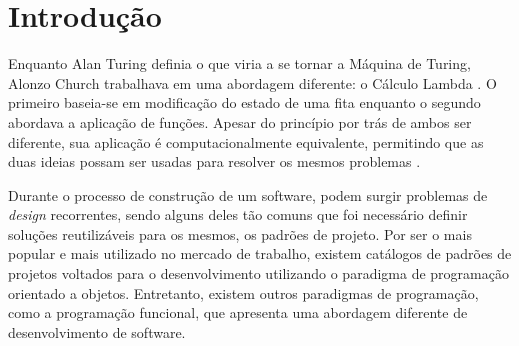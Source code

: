 
\chapter{Introdução}
%

Enquanto Alan Turing definia o que viria a 
se tornar a Máquina de Turing, Alonzo Church 
trabalhava em uma abordagem diferente: o Cálculo Lambda
\cite{church1932set,church1936unsolvable,sep-turing-machine}. 
O primeiro baseia-se em modificação do estado de 
uma fita enquanto o segundo abordava a aplicação 
de funções. Apesar do princípio por trás de ambos 
ser diferente, sua aplicação é computacionalmente 
equivalente, permitindo que as duas ideias possam 
ser usadas para resolver os mesmos problemas
\cite{sep-church-turing}.


Durante o processo de construção de um 
software, podem surgir problemas de \textit{design} 
recorrentes, sendo alguns deles 
tão comuns que foi necessário definir soluções 
reutilizáveis para os mesmos, os padrões 
de projeto. Por ser o mais 
popular e mais utilizado no mercado de trabalho, 
existem catálogos de padrões de projetos voltados 
para o desenvolvimento utilizando o 
paradigma de programação orientado a objetos. 
Entretanto, existem outros paradigmas de 
programação, como a programação funcional, 
que apresenta uma abordagem diferente 
de desenvolvimento de software.

